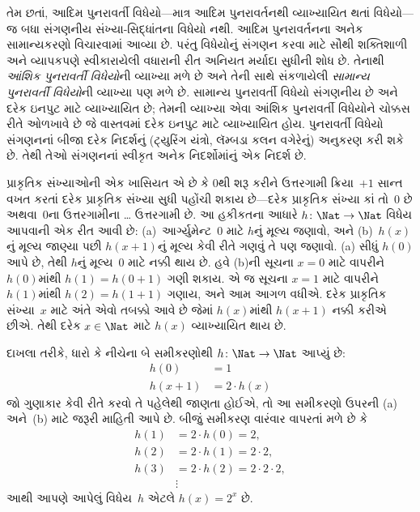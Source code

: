 તેમ છતાં, આદિમ પુનરાવર્તી વિધેયો---માત્ર આદિમ પુનરાવર્તનથી વ્યાખ્યાયિત
થતાં વિધેયો---જ બધા સંગણનીય સંખ્યા-સિદ્ધાંતના વિધેયો નથી. આદિમ
પુનરાવર્તનના અનેક સામાન્યકરણો વિચારવામાં આવ્યા છે. પરંતુ વિધેયોનું
સંગણન કરવા માટે સૌથી શક્તિશાળી અને વ્યાપકપણે સ્વીકારાયેલી વધારાની રીત
અનિયત મર્યાદા સુધીની શોધ છે. તેનાથી \emph{આંશિક પુનરાવર્તી વિધેયો}ની
વ્યાખ્યા મળે છે અને તેની સાથે સંકળાયેલી \emph{સામાન્ય પુનરાવર્તી
વિધેયો}ની વ્યાખ્યા પણ મળે છે. સામાન્ય પુનરાવર્તી વિધેયો સંગણનીય છે
અને દરેક ઇનપુટ માટે વ્યાખ્યાયિત છે; તેમની વ્યાખ્યા એવા આંશિક
પુનરાવર્તી વિધેયોને ચોક્કસ રીતે ઓળખાવે છે જે વાસ્તવમાં દરેક ઇનપુટ માટે
વ્યાખ્યાયિત હોય. પુનરાવર્તી વિધેયો સંગણનનાં બીજા દરેક નિદર્શનું
(ટ્યુરિંગ યંત્રો, લૅમ્બડા કલન વગેરેનું) અનુકરણ કરી શકે છે. તેથી તેઓ
સંગણનનાં સ્વીકૃત અનેક નિદર્શોમાંનું એક નિદર્શ છે.
\endgroup


\begingroup
\makeatletter{}\makeatother

\label{guunit:OLP-0211}


પ્રાકૃતિક સંખ્યાઓની એક ખાસિયત એ છે કે $0$થી શરૂ કરીને ઉત્તરગામી
ક્રિયા~$+1$ સાન્ત વખત કરતાં દરેક પ્રાકૃતિક સંખ્યા સુધી પહોંચી શકાય
છે---દરેક પ્રાકૃતિક સંખ્યા કાં તો~$0$ છે અથવા~$0$ના ઉત્તરગામીના
\dots{} ઉત્તરગામી છે. આ હકીકતના આધારે $h\colon\Nat \to \Nat$
વિધેય આપવાની એક રીત આવી છે: (a)~આર્ગ્યુમેન્ટ~$0$ માટે $h$નું મૂલ્ય
જણાવો, અને (b)~$h(x)$નું મૂલ્ય જાણ્યા પછી $h(x+1)$નું મૂલ્ય કેવી રીતે
ગણવું તે પણ જણાવો. (a) સીધું $h(0)$ આપે છે, તેથી $h$નું મૂલ્ય~$0$ માટે
નક્કી થાય છે. હવે (b)ની સૂચના $x=0$ માટે વાપરીને~$h(0)$માંથી
$h(1) = h(0+1)$ ગણી શકાય. એ જ સૂચના $x=1$ માટે વાપરીને~$h(1)$માંથી
$h(2) = h(1+1)$ ગણાય, અને આમ આગળ વધીએ. દરેક પ્રાકૃતિક સંખ્યા~$x$
માટે અંતે એવો તબક્કો આવે છે જેમાં $h(x)$માંથી $h(x+1)$ નક્કી કરીએ
છીએ. તેથી દરેક $x \in \Nat$ માટે $h(x)$ વ્યાખ્યાયિત થાય છે.


દાખલા તરીકે, ધારો કે નીચેના બે સમીકરણોથી $h\colon \Nat \to \Nat$
આપ્યું છે:
\begin{align*}
h(0) & =  1\\
h(x+1) & =  2 \cdot h(x)
\end{align*}
જો ગુણાકાર કેવી રીતે કરવો તે પહેલેથી જાણતા હોઈએ, તો આ સમીકરણો ઉપરની
(a) અને~(b) માટે જરૂરી માહિતી આપે છે. બીજું સમીકરણ વારંવાર વાપરતાં
મળે છે કે
\begin{align*}
  h(1) & = 2\cdot h(0) = 2,\\
  h(2) & = 2\cdot h(1) = 2\cdot 2,\\
  h(3) & = 2 \cdot h(2) = 2\cdot 2 \cdot 2,\\
  & \vdots
\end{align*}
આથી આપણે આપેલું વિધેય~$h$ એટલે $h(x) = 2^x$ છે.

